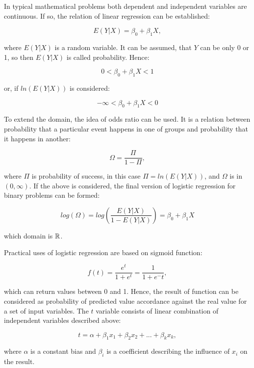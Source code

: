 \documentclass[energies,article,submit,pdftex,moreauthors]{Definitions/mdpi}
\begin{document}
In typical mathematical problems both dependent and independent variables are continuous. If so, the relation of linear regression can be established:
\begin{linenomath}
\begin{equation}
E(Y|X) = \beta_0 + \beta_1 X,
\end{equation}
\end{linenomath}
where $ E(Y|X) $ is a random variable. It can be assumed, that $ Y $ can be only 0 or 1, so then $ E(Y|X) $ is called probability. Hence:
\begin{linenomath}
\begin{equation}
0 < \beta_0 + \beta_1 X < 1
\end{equation}
\end{linenomath}
or, if $ ln(E(Y|X)) $ is considered:
\begin{linenomath}
\begin{equation}
-\infty < \beta_0 + \beta_1 X < 0
\end{equation}
\end{linenomath}
To extend the domain, the idea of odds ratio can be used. It is a relation between probability that a particular event happens in one of groups and probability that it happens in another:
\begin{linenomath}
\begin{equation}
\Omega = \frac{\Pi}{1-\Pi},
\end{equation}
\end{linenomath}
where $ \Pi $ is probability of success, in this case $ \Pi = ln(E(Y|X)) $, and $ \Omega $ is in $ (0, \infty)$. If the above is considered, the final version of logistic regression for binary problems can be formed:
\begin{linenomath}
\begin{equation}
log(\Omega) = log(\frac{E(Y|X)}{1 - E(Y|X)}) = \beta_0 + \beta_1 X
\end{equation}
\end{linenomath}
which domain is $ {\Bbb R} $.

\vspace{5mm}
Practical uses of logistic regression are based on sigmoid function:
\begin{linenomath}
\begin{equation}
f(t) = \frac{e^t}{1+e^t} = \frac{1}{1+e^-t},
\end{equation}
\end{linenomath}
which can return values between 0 and 1. Hence, the result of function can be considered as probability of predicted value accordance against the real value for a set of input variables. The $ t $ variable consists of linear combination of independent variables described above:
\begin{linenomath}
\begin{equation}
t = \alpha + \beta_1 x_1 + \beta_2 x_2 + ... + \beta_k x_k,
\end{equation}
\end{linenomath}
where $ \alpha $ is a constant bias and $ \beta_i $ is a coefficient describing the influence of $ x_i $ on the result.
\end{document}
